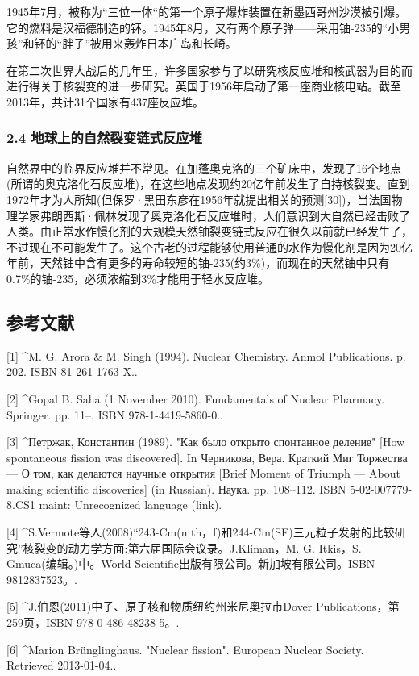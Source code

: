 1945年7月，被称为“三位一体“的第一个原子爆炸装置在新墨西哥州沙漠被引爆。它的燃料是汉福德制造的钚。1945年8月，又有两个原子弹——采用铀-235的“小男孩”和钚的“胖子”被用来轰炸日本广岛和长崎。

在第二次世界大战后的几年里，许多国家参与了以研究核反应堆和核武器为目的而进行得关于核裂变的进一步研究。英国于1956年启动了第一座商业核电站。截至2013年，共计31个国家有437座反应堆。

\subsubsection{2.4 地球上的自然裂变链式反应堆}
自然界中的临界反应堆并不常见。在加蓬奥克洛的三个矿床中，发现了16个地点(所谓的奥克洛化石反应堆)，在这些地点发现约20亿年前发生了自持核裂变。直到1972年才为人所知(但保罗·黑田东彦在1956年就提出相关的预测[30])，当法国物理学家弗朗西斯·佩林发现了奥克洛化石反应堆时，人们意识到大自然已经击败了人类。由正常水作慢化剂的大规模天然铀裂变链式反应在很久以前就已经发生了，不过现在不可能发生了。这个古老的过程能够使用普通的水作为慢化剂是因为20亿年前，天然铀中含有更多的寿命较短的铀-235(约3\%)，而现在的天然铀中只有0.7\%的铀-235，必须浓缩到3\%才能用于轻水反应堆。

\subsection{参考文献}
[1]
^M. G. Arora & M. Singh (1994). Nuclear Chemistry. Anmol Publications. p. 202. ISBN 81-261-1763-X..

[2]
^Gopal B. Saha (1 November 2010). Fundamentals of Nuclear Pharmacy. Springer. pp. 11–. ISBN 978-1-4419-5860-0..

[3]
^Петржак, Константин (1989). "Как было открыто спонтанное деление" [How spontaneous fission was discovered]. In Черникова, Вера. Краткий Миг Торжества — О том, как делаются научные открытия [Brief Moment of Triumph — About making scientific discoveries] (in Russian). Наука. pp. 108–112. ISBN 5-02-007779-8.CS1 maint: Unrecognized language (link).

[4]
^S.Vermote等人(2008)“243-Cm(n th，f)和244-Cm(SF)三元粒子发射的比较研究”核裂变的动力学方面:第六届国际会议录。J.Kliman，M. G. Itkis，S. Gmuca(编辑。)中。World Scientific出版有限公司。新加坡有限公司。ISBN 9812837523。.

[5]
^J.伯恩(2011)中子、原子核和物质纽约州米尼奥拉市Dover Publications，第259页，ISBN 978-0-486-48238-5。.

[6]
^Marion Brünglinghaus. "Nuclear fission". European Nuclear Society. Retrieved 2013-01-04..

